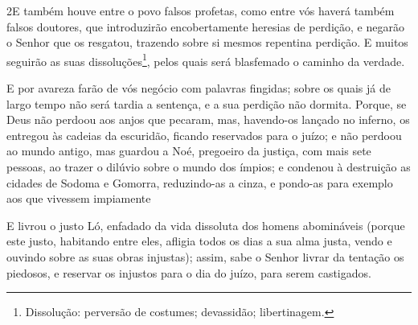 \medskip

\lettrine{2} E também houve entre o povo falsos profetas, como
entre vós haverá também falsos doutores, que introduzirão
encobertamente heresias de perdição, e negarão o Senhor que os
resgatou, trazendo sobre si mesmos repentina perdição. E muitos
seguirão as suas dissoluções\footnote{Dissolução: perversão de
costumes; devassidão; libertinagem.}, pelos quais será blasfemado o
caminho da verdade.

E por avareza farão de vós negócio com palavras fingidas; sobre os
quais já de largo tempo não será tardia a sentença, e a sua perdição
não dormita. Porque, se Deus não perdoou aos anjos que pecaram,
mas, havendo-os lançado no inferno, os entregou às cadeias da
escuridão, ficando reservados para o juízo; e não perdoou ao
mundo antigo, mas guardou a Noé, pregoeiro da justiça, com mais sete
pessoas, ao trazer o dilúvio sobre o mundo dos ímpios; e
condenou à destruição as cidades de Sodoma e Gomorra, reduzindo-as a
cinza, e pondo-as para exemplo aos que vivessem impiamente

E livrou o justo Ló, enfadado da vida dissoluta dos homens
abomináveis (porque este justo, habitando entre eles, afligia
todos os dias a sua alma justa, vendo e ouvindo sobre as suas obras
injustas); assim, sabe o Senhor livrar da tentação os piedosos,
e reservar os injustos para o dia do juízo, para serem castigados.

